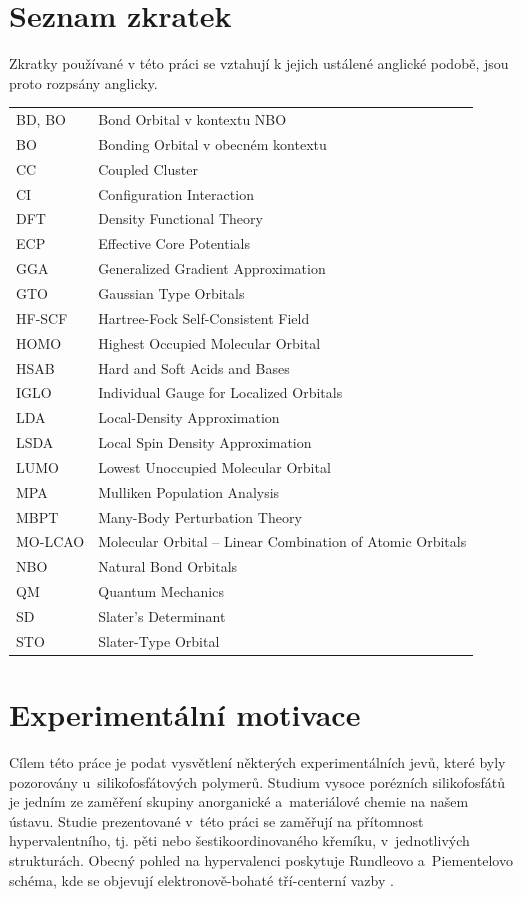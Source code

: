 \documentclass[
digital, %
table,   %
nolof,     %
nolot,     %
oneside,
]{fithesis3}
\begin{document}
\chapter*{Seznam zkratek}
Zkratky používané v této práci se vztahují k jejich ustálené anglické podobě, jsou proto rozpsány anglicky.
\begin{table}[htbp]
\begin{tabular}{l l}
BD, BO & Bond Orbital v kontextu NBO\\
BO &  Bonding Orbital v obecném kontextu \\
CC & Coupled Cluster \\
CI & Configuration Interaction \\
DFT & Density Functional Theory \\
ECP & Effective Core Potentials \\
GGA &  Generalized Gradient Approximation \\
GTO & Gaussian Type Orbitals \\
HF-SCF & Hartree-Fock Self-Consistent Field \\
HOMO  & Highest Occupied Molecular Orbital \\
HSAB & Hard and Soft Acids and Bases \\
IGLO & Individual Gauge for Localized Orbitals \\
LDA & Local-Density Approximation \\
LSDA & Local Spin Density Approximation \\
LUMO & Lowest Unoccupied Molecular Orbital \\
MPA & Mulliken Population Analysis \\
MBPT &  Many-Body Perturbation Theory \\
MO-LCAO & Molecular Orbital – Linear Combination of Atomic Orbitals \\
NBO & Natural Bond Orbitals \\
QM & Quantum Mechanics \\
SD & Slater's Determinant \\
STO & Slater-Type Orbital  \\
\end{tabular}
\end{table}

\chapter{Experimentální motivace}
Cílem této práce je podat vysvětlení některých experimentálních jevů, které byly pozorovány u~silikofosfátových polymerů. Studium vysoce porézních silikofosfátů je jedním ze zaměření skupiny anorganické a~materiálové chemie na našem ústavu. Studie prezentované v~této práci se zaměřují na přítomnost hypervalentního, tj. pěti nebo šestikoordinovaného křemíku, v~jednotlivých strukturách. Obecný pohled na hypervalenci poskytuje Rundleovo a~Piementelovo schéma, kde se objevují elektronově-bohaté tří-centerní vazby \cite{405827, Munzarova2001}.
\end{document}
